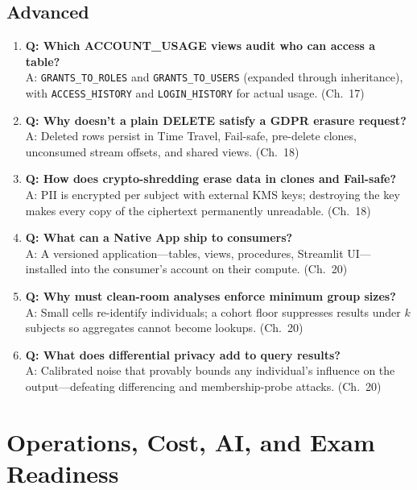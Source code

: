 \subsection{Advanced}
\begin{enumerate}
    \item \textbf{Q: Which ACCOUNT\_USAGE views audit who can access a table?}\\
    A: \texttt{GRANTS\_TO\_ROLES} and \texttt{GRANTS\_TO\_USERS} (expanded through inheritance), with \texttt{ACCESS\_HISTORY} and \texttt{LOGIN\_HISTORY} for actual usage. (Ch.~17)
    \item \textbf{Q: Why doesn't a plain DELETE satisfy a GDPR erasure request?}\\
    A: Deleted rows persist in Time Travel, Fail-safe, pre-delete clones, unconsumed stream offsets, and shared views. (Ch.~18)
    \item \textbf{Q: How does crypto-shredding erase data in clones and Fail-safe?}\\
    A: PII is encrypted per subject with external KMS keys; destroying the key makes every copy of the ciphertext permanently unreadable. (Ch.~18)
    \item \textbf{Q: What can a Native App ship to consumers?}\\
    A: A versioned application---tables, views, procedures, Streamlit UI---installed into the consumer's account on their compute. (Ch.~20)
    \item \textbf{Q: Why must clean-room analyses enforce minimum group sizes?}\\
    A: Small cells re-identify individuals; a cohort floor suppresses results under $k$ subjects so aggregates cannot become lookups. (Ch.~20)
    \item \textbf{Q: What does differential privacy add to query results?}\\
    A: Calibrated noise that provably bounds any individual's influence on the output---defeating differencing and membership-probe attacks. (Ch.~20)
\end{enumerate}

\section{Operations, Cost, AI, and Exam Readiness}

